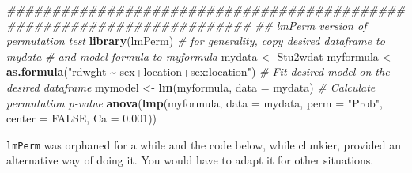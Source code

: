 \documentclass[
  12pt,
]{book}
\newenvironment{Shaded}{\begin{snugshade}}{\end{snugshade}}
\newcommand{\CommentTok}[1]{\textcolor[rgb]{0.56,0.35,0.01}{\textit{#1}}}
\newcommand{\DataTypeTok}[1]{\textcolor[rgb]{0.13,0.29,0.53}{#1}}
\newcommand{\FloatTok}[1]{\textcolor[rgb]{0.00,0.00,0.81}{#1}}
\newcommand{\KeywordTok}[1]{\textcolor[rgb]{0.13,0.29,0.53}{\textbf{#1}}}
\newcommand{\NormalTok}[1]{#1}
\newcommand{\OtherTok}[1]{\textcolor[rgb]{0.56,0.35,0.01}{#1}}
\newcommand{\StringTok}[1]{\textcolor[rgb]{0.31,0.60,0.02}{#1}}
\begin{document}
\begin{Shaded}
\begin{Highlighting}[]
\CommentTok{\#\#\#\#\#\#\#\#\#\#\#\#\#\#\#\#\#\#\#\#\#\#\#\#\#\#\#\#\#\#\#\#\#\#\#\#\#\#\#\#\#\#\#\#\#\#\#\#\#\#\#\#\#\#\#\#\#\#\#\#\#\#\#\#\#\#\#\#\#\#\#}
\CommentTok{\#\# lmPerm version of permutation test}
\KeywordTok{library}\NormalTok{(lmPerm)}
\CommentTok{\# for generality, copy desired dataframe to mydata}
\CommentTok{\# and model formula to myformula}
\NormalTok{mydata \textless{}{-}}\StringTok{ }\NormalTok{Stu2wdat}
\NormalTok{myformula \textless{}{-}}\StringTok{ }\KeywordTok{as.formula}\NormalTok{(}\StringTok{"rdwght \textasciitilde{} sex+location+sex:location"}\NormalTok{)}
\CommentTok{\# Fit desired model on the desired dataframe}
\NormalTok{mymodel \textless{}{-}}\StringTok{ }\KeywordTok{lm}\NormalTok{(myformula, }\DataTypeTok{data =}\NormalTok{ mydata)}
\CommentTok{\# Calculate permutation p{-}value}
\KeywordTok{anova}\NormalTok{(}\KeywordTok{lmp}\NormalTok{(myformula, }\DataTypeTok{data =}\NormalTok{ mydata, }\DataTypeTok{perm =} \StringTok{"Prob"}\NormalTok{, }\DataTypeTok{center =} \OtherTok{FALSE}\NormalTok{, }\DataTypeTok{Ca =} \FloatTok{0.001}\NormalTok{))}
\end{Highlighting}
\end{Shaded}

\texttt{lmPerm} was orphaned for a while and the code below, while clunkier, provided an alternative way of doing it. You would have to adapt it for other situations.
\end{document}
